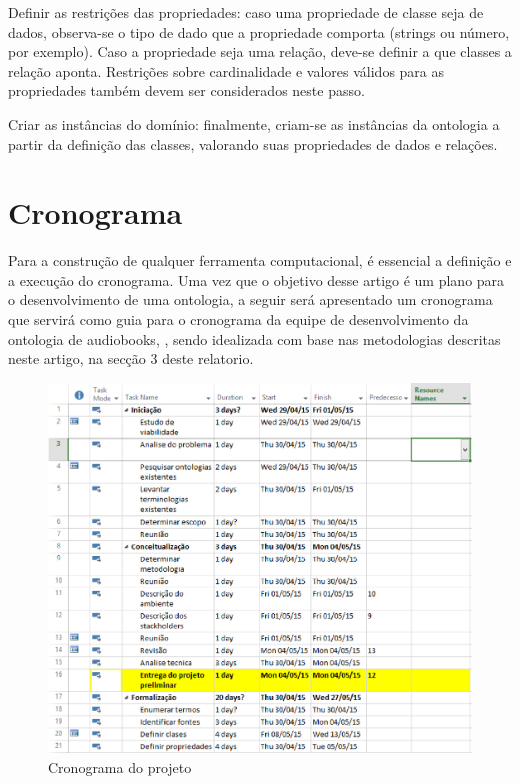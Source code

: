 Definir as restrições das propriedades: caso uma propriedade de classe seja de dados, observa-se o tipo de dado que a propriedade comporta (strings ou número, por exemplo). Caso a propriedade seja uma relação, deve-se definir a que classes a relação aponta. Restrições sobre cardinalidade e valores válidos para as propriedades também devem ser considerados neste passo.

Criar as instâncias do domínio: finalmente, criam-se as instâncias da ontologia a partir da definição das classes, valorando suas propriedades de dados e relações.

\chapter{Cronograma}\label{cap4}

Para a construção de qualquer ferramenta computacional, é essencial a definição e a execução do cronograma. Uma vez que o objetivo desse artigo é um plano para o desenvolvimento de uma ontologia, a seguir será apresentado um cronograma que servirá como guia para o cronograma da equipe de desenvolvimento da ontologia de audiobooks, , sendo idealizada com base nas metodologias descritas neste artigo, na secção 3 deste relatorio.

 \begin{figure}[ht]
  \centering
    \includegraphics[keepaspectratio=true,scale=0.5]{figuras/cronograma1.eps}
  \caption{Cronograma do projeto}
\end{figure}


